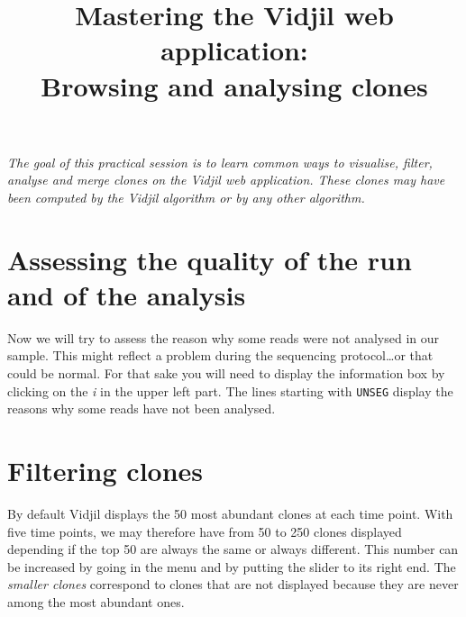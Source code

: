 \documentclass[11pt]{article}
\title{Mastering the Vidjil web application:\\ Browsing and analysing clones}
\begin{document}
\maketitle

\textit{The goal of this practical session is to learn
common ways to visualise, filter, analyse and merge clones
on the Vidjil web application.
%
These clones may have been computed by the Vidjil algorithm or by any other algorithm.}

\bigskip


\section{Assessing the quality of the run and of the analysis}



Now we will try to assess the reason why some reads were not analysed in our
sample.
This might reflect a problem during the sequencing protocol\dots or that could
be normal.
For that sake you will need to display the information box by clicking on the
\textit{i} in the upper left part.
The lines starting with \texttt{UNSEG} display the reasons why some reads have
not been analysed.

\section{Filtering clones}


By default Vidjil displays the 50 most abundant clones at each time point.
With five time points, we may therefore have from 50 to 250 clones displayed
depending if the top 50 are always the same or always different.
This number can be increased by going in the  menu and by putting the
slider to its right end.
The \textit{smaller clones} correspond to clones that are not displayed
because they are never among the most abundant ones.
\end{document}

